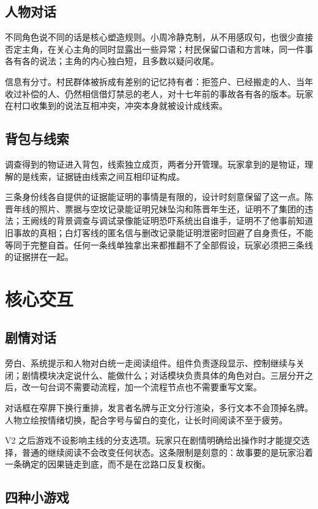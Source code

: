 \subsection{人物对话}

不同角色说不同的话是核心塑造规则。小周冷静克制，从不用感叹句，也很少直接否定主角，在关心主角的同时显露出一些异常；村民保留口语和方言味，同一件事各有各的说法；主角的内心独白短，且多数以疑问收尾。

信息有分寸。村民群体被拆成有差别的记忆持有者：拒签户、已经搬走的人、当年收过补偿的人、仍然相信借灯禁忌的老人，对十七年前的事故各有各的版本。玩家在村口收集到的说法互相冲突，冲突本身就被设计成线索。

\subsection{背包与线索}

调查得到的物证进入背包，线索独立成页，两者分开管理。玩家拿到的是物证，理解的是线索，证据链由线索之间互相印证构成。

三条身份线各自提供的证据能证明的事情是有限的，设计时刻意保留了这一点。陈晋年线的照片、票据与空坟记录能证明兄妹坠沟和陈晋年生还，证明不了集团的违法；王阙线的背景调查与调试录像能证明恐吓系统出自谁手，证明不了他事前知道旧事故的真相；白灯客线的匿名信与删改记录能证明泄密时回避了自身责任，不能等同于完整自首。任何一条线单独拿出来都推翻不了全部假设，玩家必须把三条线的证据拼在一起。

\section{核心交互}

\subsection{剧情对话}

旁白、系统提示和人物对白统一走阅读组件。组件负责逐段显示、控制继续与关闭；剧情模块决定说什么、能做什么；对话模块负责具体的角色对白。三层分开之后，改一句台词不需要动流程，加一个流程节点也不需要重写文案。

对话框在窄屏下换行重排，发言者名牌与正文分行渲染，多行文本不会顶掉名牌。人物立绘按情绪切换，配合字号与留白的变化，让长时间阅读不至于疲劳。

V2 之后游戏不设影响主线的分支选项。玩家只在剧情明确给出操作时才能提交选择，普通的继续阅读不会改变任何状态。这条限制是刻意的：故事要的是玩家沿着一条确定的因果链走到底，而不是在岔路口反复权衡。

\subsection{四种小游戏}

